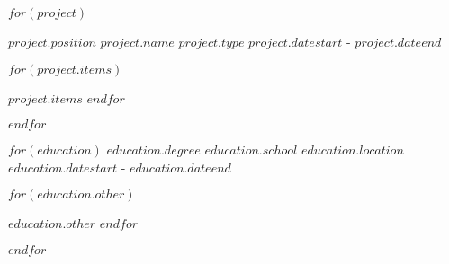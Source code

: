 \documentclass[11pt, a4paper]{awesome-cv}
\begin{document}


\begin{cventries}
$for(project)$
  
  \cventry
    {$project.position$} %
    {$project.name$} %
    {$project.type$} %
    {$project.datestart$ - $project.dateend$} %
    {
      \begin{cvitems} %
        $for(project.items)$
        \item{$project.items$}
        $endfor$
      \end{cvitems}
    }
    \linebreak
$endfor$

\end{cventries}


\begin{cventries}
$for(education)$
    \cventry
    {$education.degree$} %
    {$education.school$} %
    {$education.location$} %
    {$education.datestart$ - $education.dateend$} %
    {
      \begin{cvitems} %
        $for(education.other)$
        \item{$education.other$}
        $endfor$
      \end{cvitems}
    }
    \linebreak
$endfor$
\end{cventries}
\end{document}
